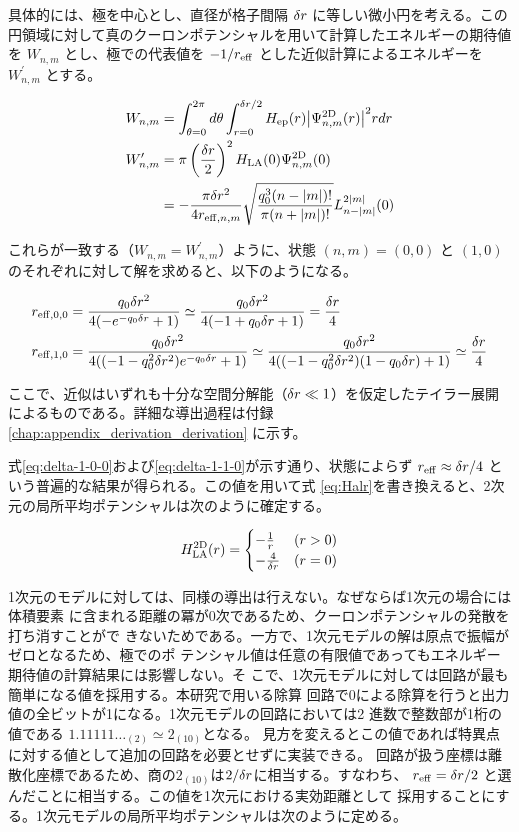 \documentclass[wabun2025.tex]{subfiles}
\begin{document}
具体的には、極を中心とし、直径が格子間隔 $\delta r$ に等しい微小円を考える。この
円領域に対して真のクーロンポテンシャルを用いて計算したエネルギーの期待値を
$W_{n,m}$ とし、極での代表値を $-1/r_{\mathrm{eff}}$ とした近似計算によるエネルギーを
$W_{n,m}^\prime$ とする。

\begin{align}
    W_{n,m}&=\int_{\theta=0}^{2\pi}d\theta\int_{r=0}^{\delta r/2}
    H_{\mathrm{ep}}(r){\left| \Psi^{\mathrm{2D}}_{n,m}(r) \right|}^2r dr\\
    W_{n,m}^\prime&=\pi\left(\frac{\delta r}{2}\right)^2
    H_{\mathrm{LA}}(0)\Psi^{\mathrm{2D}}_{n,m}(0) \notag \\
    &=-\frac{\pi\delta r^2}{4r_{\mathrm{eff},n,m}}
    \sqrt{\frac{q_0^3(n-{\left| m \right|})!}{\pi(n+{\left| m \right|})!}}
    L_{n-{\left| m \right|}}^{2{\left| m \right|}}(0)
\end{align}

これらが一致する（$W_{n,m}=W_{n,m}^\prime$）ように、状態 $(n,m)=(0,0)$ と
$(1,0)$ のそれぞれに対して解を求めると、以下のようになる。

\begin{align}
    r_{\mathrm{eff},0,0} &=\frac{q_0\delta r^2}{4(-e^{-q_0\delta r}+1)}
    \simeq \frac{q_0\delta r^2}{4(-1+q_0\delta r+1)}=\frac{\delta r}{4}
    \label{eq:delta-1-0-0}\\
    r_{\mathrm{eff},1,0} &=\frac{q_0\delta r^2}{4((-1-q_0^2\delta r^2)e^{-q_0\delta r}+1)}
    \simeq \frac{q_0\delta r^2}{4((-1-q_0^2\delta r^2)(1-q_0\delta r)+1)}
    \simeq\frac{\delta r}{4}
    \label{eq:delta-1-1-0}
\end{align}

ここで、近似はいずれも十分な空間分解能（$\delta r \ll 1$）を仮定したテイラー展開
によるものである。詳細な導出過程は付録\ref{chap:appendix_derivation_derivation}
に示す。

式\eqref{eq:delta-1-0-0}および\eqref{eq:delta-1-1-0}が示す通り、状態によらず
$r_{\mathrm{eff}} \approx \delta r/4$ という普遍的な結果が得られる。この値を用いて式
\eqref{eq:Halr}を書き換えると、2次元の局所平均ポテンシャルは次のように確定する。

\begin{equation}
H_{\mathrm{LA}}^{\mathrm{2D}}(r) = \begin{cases}
-\frac{1}{r} & (r>0) \\
-\frac{4}{\delta r} & (r=0)
\end{cases}
\label{eq:Hlar2d-fixed}
\end{equation}

1次元のモデルに対しては、同様の導出は行えない。なぜならば1次元の場合には体積要素
に含まれる距離の冪が0次であるため、クーロンポテンシャルの発散を打ち消すことがで
きないためである。一方で、1次元モデルの解は原点で振幅がゼロとなるため、極でのポ
テンシャル値は任意の有限値であってもエネルギー期待値の計算結果には影響しない。そ
こで、1次元モデルに対しては回路が最も簡単になる値を採用する。本研究で用いる除算
回路で0による除算を行うと出力値の全ビットが1になる。1次元モデルの回路においては2
進数で整数部が1桁の値である $1.11111\ldots_{(2)}\simeq 2_{(10)}$となる。
見方を変えるとこの値であれば特異点に対する値として追加の回路を必要とせずに実装できる。
回路が扱う座標は離散化座標であるため、商の$2_{(10)}$は$2/\delta r$に相当する。すなわち、
$r_{\mathrm{eff}} = \delta r/2$ と選んだことに相当する。この値を1次元における実効距離として
採用することにする。1次元モデルの局所平均ポテンシャルは次のように定める。
\end{document}
